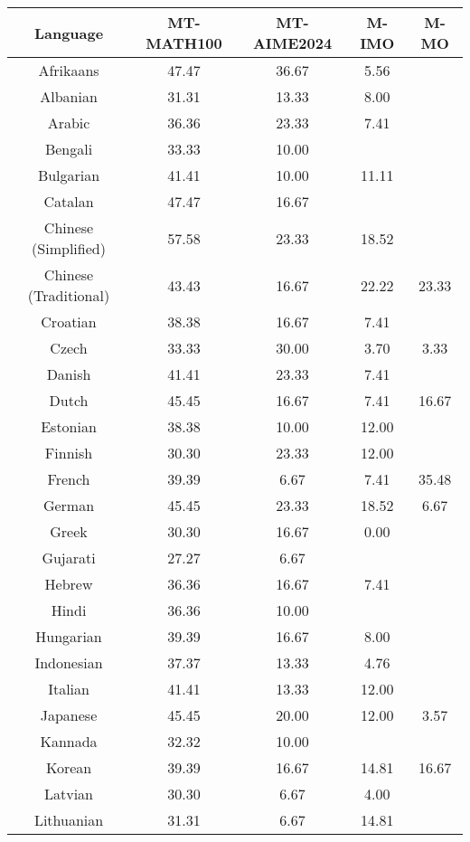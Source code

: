 \begin{table*}[]
\centering
\fontsize{9}{11} \selectfont
\begin{tabular}{c|cccc}
\toprule
\textbf{Language} & \textbf{MT-MATH100} & \textbf{MT-AIME2024} & \textbf{M-IMO} & \textbf{M-MO} \\ \midrule
Afrikaans & 47.47 & 36.67 & 5.56 &  \\
Albanian & 31.31 & 13.33 & 8.00 &  \\
Arabic & 36.36 & 23.33 & 7.41 &  \\
Bengali & 33.33 & 10.00 & \multicolumn{1}{l}{} &  \\
Bulgarian & 41.41 & 10.00 & 11.11 &  \\
Catalan & 47.47 & 16.67 & \multicolumn{1}{l}{} &  \\
Chinese (Simplified) & 57.58 & 23.33 & 18.52 &  \\
Chinese (Traditional) & 43.43 & 16.67 & 22.22 & \multirow{-2}{*}{23.33} \\
Croatian & 38.38 & 16.67 & 7.41 &  \\
Czech & 33.33 & 30.00 & 3.70 & 3.33 \\
Danish & 41.41 & 23.33 & 7.41 &  \\
Dutch & 45.45 & 16.67 & 7.41 & 16.67 \\
Estonian & 38.38 & 10.00 & 12.00 &  \\
Finnish & 30.30 & 23.33 & 12.00 &  \\
French & 39.39 & 6.67 & 7.41 & 35.48 \\
German & 45.45 & 23.33 & 18.52 & 6.67 \\
Greek & 30.30 & 16.67 & 0.00 &  \\
Gujarati & 27.27 & 6.67 & \multicolumn{1}{l}{} &  \\
Hebrew & 36.36 & 16.67 & 7.41 &  \\
Hindi & 36.36 & 10.00 & \multicolumn{1}{l}{} &  \\
Hungarian & 39.39 & 16.67 & 8.00 &  \\
Indonesian & 37.37 & 13.33 & 4.76 &  \\
Italian & 41.41 & 13.33 & 12.00 &  \\
Japanese & 45.45 & 20.00 & 12.00 & 3.57 \\
Kannada & 32.32 & 10.00 & \multicolumn{1}{l}{} &  \\
Korean & 39.39 & 16.67 & 14.81 & 16.67 \\
Latvian & 30.30 & 6.67 & 4.00 &  \\
Lithuanian & 31.31 & 6.67 & 14.81 &  \\

\end{tabular}
\end{table*}
